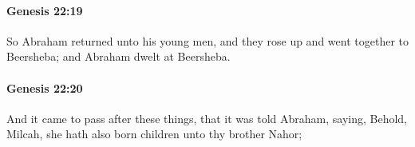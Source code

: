 		\paragraph{Genesis 22:19} %
			\label{GENESIS-22-19}

			So Abraham returned unto his young men, and they rose up and went together to Beersheba; and Abraham dwelt at Beersheba.


		\paragraph{Genesis 22:20} %
			\label{GENESIS-22-20}

			And it came to pass after these things, that it was told Abraham, saying, Behold, Milcah, she hath also born children unto thy brother Nahor;


